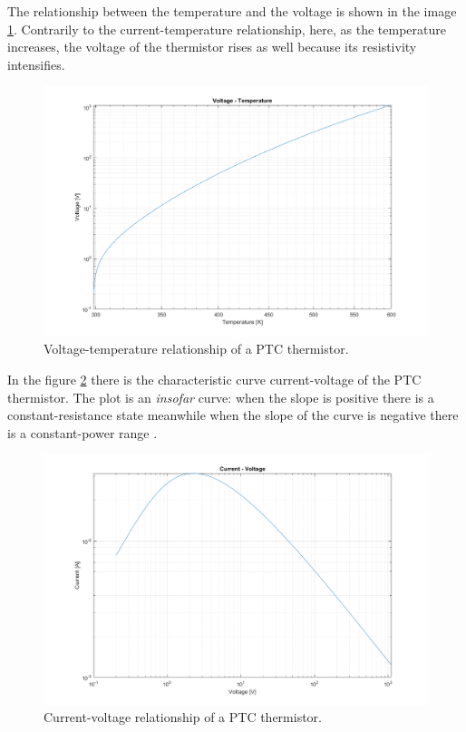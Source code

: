 \FloatBarrier \noindent The relationship between the temperature and the voltage is shown in the image \ref{fig:PTC_volt-temp}. Contrarily to the current-temperature relationship, here, as the temperature increases, the voltage of the thermistor rises as well because its resistivity intensifies.

\begin{figure}[h]
    \centering
    \includegraphics[width = .75\textwidth]{../res/plots/PTC_volt-temp.png}
    \caption{Voltage-temperature relationship of a PTC thermistor.}
    \label{fig:PTC_volt-temp}
\end{figure}

\FloatBarrier \noindent In the figure \ref{fig:PTC_curr-volt} there is the characteristic curve current-voltage of the PTC thermistor. The plot is an \textsl{insofar} curve: when the slope is positive there is a constant-resistance state meanwhile when the slope of the curve is negative there is a constant-power range \cite{Saburi196353}.

\begin{figure}[h]
    \centering
    \includegraphics[width = .75\textwidth]{../res/plots/PTC_curr-volt.png}
    \caption{Current-voltage relationship of a PTC thermistor.}
    \label{fig:PTC_curr-volt}
\end{figure}

